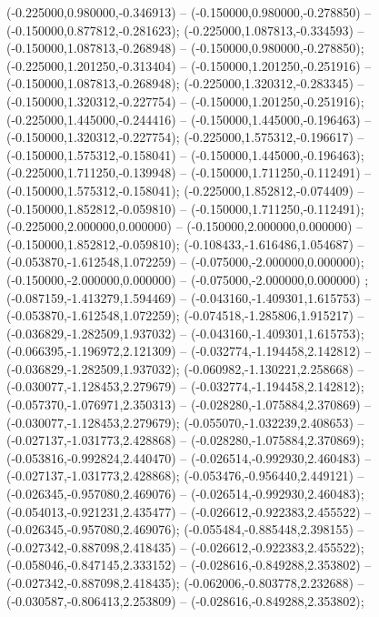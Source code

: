  (-0.225000,0.980000,-0.346913) -- (-0.150000,0.980000,-0.278850) -- (-0.150000,0.877812,-0.281623);
 (-0.225000,1.087813,-0.334593) -- (-0.150000,1.087813,-0.268948) -- (-0.150000,0.980000,-0.278850);
 (-0.225000,1.201250,-0.313404) -- (-0.150000,1.201250,-0.251916) -- (-0.150000,1.087813,-0.268948);
 (-0.225000,1.320312,-0.283345) -- (-0.150000,1.320312,-0.227754) -- (-0.150000,1.201250,-0.251916);
 (-0.225000,1.445000,-0.244416) -- (-0.150000,1.445000,-0.196463) -- (-0.150000,1.320312,-0.227754);
 (-0.225000,1.575312,-0.196617) -- (-0.150000,1.575312,-0.158041) -- (-0.150000,1.445000,-0.196463);
 (-0.225000,1.711250,-0.139948) -- (-0.150000,1.711250,-0.112491) -- (-0.150000,1.575312,-0.158041);
 (-0.225000,1.852812,-0.074409) -- (-0.150000,1.852812,-0.059810) -- (-0.150000,1.711250,-0.112491);
 (-0.225000,2.000000,0.000000) -- (-0.150000,2.000000,0.000000) -- (-0.150000,1.852812,-0.059810);
 (-0.108433,-1.616486,1.054687) -- (-0.053870,-1.612548,1.072259) -- (-0.075000,-2.000000,0.000000);
 (-0.150000,-2.000000,0.000000) -- (-0.075000,-2.000000,0.000000) ;
 (-0.087159,-1.413279,1.594469) -- (-0.043160,-1.409301,1.615753) -- (-0.053870,-1.612548,1.072259);
 (-0.074518,-1.285806,1.915217) -- (-0.036829,-1.282509,1.937032) -- (-0.043160,-1.409301,1.615753);
 (-0.066395,-1.196972,2.121309) -- (-0.032774,-1.194458,2.142812) -- (-0.036829,-1.282509,1.937032);
 (-0.060982,-1.130221,2.258668) -- (-0.030077,-1.128453,2.279679) -- (-0.032774,-1.194458,2.142812);
 (-0.057370,-1.076971,2.350313) -- (-0.028280,-1.075884,2.370869) -- (-0.030077,-1.128453,2.279679);
 (-0.055070,-1.032239,2.408653) -- (-0.027137,-1.031773,2.428868) -- (-0.028280,-1.075884,2.370869);
 (-0.053816,-0.992824,2.440470) -- (-0.026514,-0.992930,2.460483) -- (-0.027137,-1.031773,2.428868);
 (-0.053476,-0.956440,2.449121) -- (-0.026345,-0.957080,2.469076) -- (-0.026514,-0.992930,2.460483);
 (-0.054013,-0.921231,2.435477) -- (-0.026612,-0.922383,2.455522) -- (-0.026345,-0.957080,2.469076);
 (-0.055484,-0.885448,2.398155) -- (-0.027342,-0.887098,2.418435) -- (-0.026612,-0.922383,2.455522);
 (-0.058046,-0.847145,2.333152) -- (-0.028616,-0.849288,2.353802) -- (-0.027342,-0.887098,2.418435);
 (-0.062006,-0.803778,2.232688) -- (-0.030587,-0.806413,2.253809) -- (-0.028616,-0.849288,2.353802);
